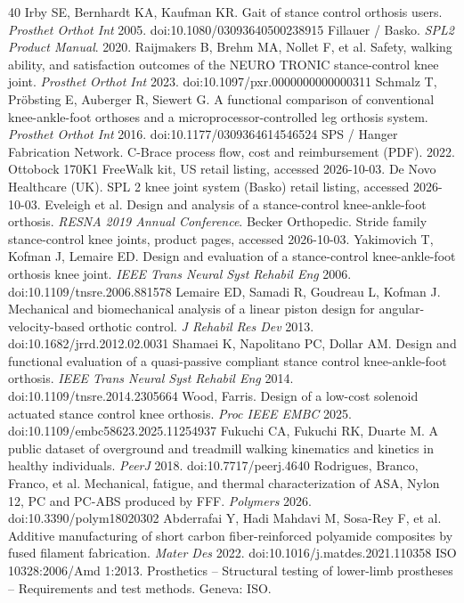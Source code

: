 \documentclass[11pt,a4paper]{article}
\begin{document}
\begin{thebibliography}{40}
 Irby SE, Bernhardt KA, Kaufman KR. Gait of stance control orthosis users. \emph{Prosthet Orthot Int} 2005. doi:10.1080/03093640500238915
 Fillauer / Basko. \emph{SPL2 Product Manual}. 2020.
 Raijmakers B, Brehm MA, Nollet F, et al. Safety, walking ability, and satisfaction outcomes of the NEURO TRONIC stance-control knee joint. \emph{Prosthet Orthot Int} 2023. doi:10.1097/pxr.0000000000000311
 Schmalz T, Pr\"obsting E, Auberger R, Siewert G. A functional comparison of conventional knee-ankle-foot orthoses and a microprocessor-controlled leg orthosis system. \emph{Prosthet Orthot Int} 2016. doi:10.1177/0309364614546524
 SPS / Hanger Fabrication Network. C-Brace process flow, cost and reimbursement (PDF). 2022.
 Ottobock 170K1 FreeWalk kit, US retail listing, accessed 2026-10-03.
 De Novo Healthcare (UK). SPL 2 knee joint system (Basko) retail listing, accessed 2026-10-03.
 Eveleigh et al. Design and analysis of a stance-control knee-ankle-foot orthosis. \emph{RESNA 2019 Annual Conference}.
 Becker Orthopedic. Stride family stance-control knee joints, product pages, accessed 2026-10-03.
 Yakimovich T, Kofman J, Lemaire ED. Design and evaluation of a stance-control knee-ankle-foot orthosis knee joint. \emph{IEEE Trans Neural Syst Rehabil Eng} 2006. doi:10.1109/tnsre.2006.881578
 Lemaire ED, Samadi R, Goudreau L, Kofman J. Mechanical and biomechanical analysis of a linear piston design for angular-velocity-based orthotic control. \emph{J Rehabil Res Dev} 2013. doi:10.1682/jrrd.2012.02.0031
 Shamaei K, Napolitano PC, Dollar AM. Design and functional evaluation of a quasi-passive compliant stance control knee-ankle-foot orthosis. \emph{IEEE Trans Neural Syst Rehabil Eng} 2014. doi:10.1109/tnsre.2014.2305664
 Wood, Farris. Design of a low-cost solenoid actuated stance control knee orthosis. \emph{Proc IEEE EMBC} 2025. doi:10.1109/embc58623.2025.11254937
 Fukuchi CA, Fukuchi RK, Duarte M. A public dataset of overground and treadmill walking kinematics and kinetics in healthy individuals. \emph{PeerJ} 2018. doi:10.7717/peerj.4640
 Rodrigues, Branco, Franco, et al. Mechanical, fatigue, and thermal characterization of ASA, Nylon 12, PC and PC-ABS produced by FFF. \emph{Polymers} 2026. doi:10.3390/polym18020302
 Abderrafai Y, Hadi Mahdavi M, Sosa-Rey F, et al. Additive manufacturing of short carbon fiber-reinforced polyamide composites by fused filament fabrication. \emph{Mater Des} 2022. doi:10.1016/j.matdes.2021.110358
 ISO 10328:2006/Amd 1:2013. Prosthetics -- Structural testing of lower-limb prostheses -- Requirements and test methods. Geneva: ISO.
\end{thebibliography}
\end{document}

